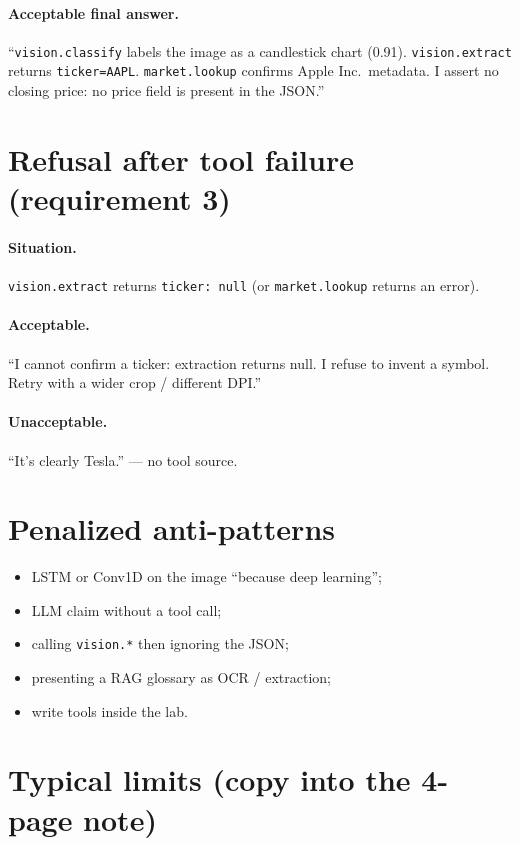\documentclass[11pt,a4paper]{article}
\begin{document}
\paragraph{Acceptable final answer.}
``\texttt{vision.classify} labels the image as a candlestick chart (0.91).
\texttt{vision.extract} returns \texttt{ticker=AAPL}.
\texttt{market.lookup} confirms Apple Inc.\ metadata.
I assert no closing price: no price field is present in the JSON.''

\section{Refusal after tool failure (requirement 3)}

\paragraph{Situation.} \texttt{vision.extract} returns \texttt{ticker: null}
(or \texttt{market.lookup} returns an error).

\paragraph{Acceptable.}
``I cannot confirm a ticker: extraction returns null.
I refuse to invent a symbol. Retry with a wider crop / different DPI.''

\paragraph{Unacceptable.}
``It's clearly Tesla.'' --- no tool source.

\section{Penalized anti-patterns}

\begin{itemize}
  \item LSTM or Conv1D on the image ``because deep learning'';
  \item LLM claim without a tool call;
  \item calling \texttt{vision.*} then ignoring the JSON;
  \item presenting a RAG glossary as OCR / extraction;
  \item write tools inside the lab.
\end{itemize}

\section{Typical limits (copy into the 4-page note)}
\end{document}
